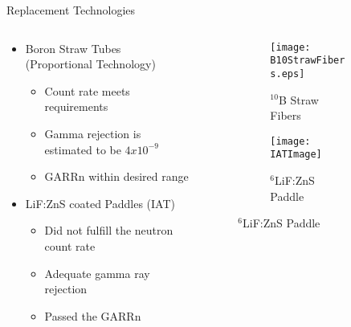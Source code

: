 \begin{frame}[fragile]{Replacement Technologies}
\begin{columns}[onlytextwidth]
\begin{column}{0.55\textwidth}
\begin{itemize}
	\small
	\item Boron Straw Tubes (Proportional Technology) \cite{kouzes_boron-lined_2012}
	\begin{itemize}
		\item Count rate meets requirements
		\item Gamma rejection is estimated to be $4x10^{-9}$
		\item GARRn within desired range
	\end{itemize}
	\small
	\item LiF:ZnS coated Paddles (IAT) \cite{kouzes_lithium_2010}
	\begin{itemize}
		\item Did not fulfill the neutron count rate
		\item Adequate gamma ray rejection
		\item Passed the GARRn
	\end{itemize}
\end{itemize}
\end{column}
\begin{column}{0.4\textwidth}
	\begin{figure}
    \centering
    \begin{subfigure}[b]{\textwidth}
      \centering
		  \texttt{[image: B10StrawFibers.eps]}
      \caption{ ${}^{10}$B Straw Fibers}
      \label{fig:B10StrawFibers}
    \end{subfigure}

    \begin{subfigure}[b]{\textwidth}
      \texttt{[image: IATImage]}
      \caption{${}^6$LiF:ZnS Paddle}
      \label{fig:LifZnSPaddle}
    \end{subfigure}
	\end{figure}
\end{column}
\end{columns}
\end{frame}
